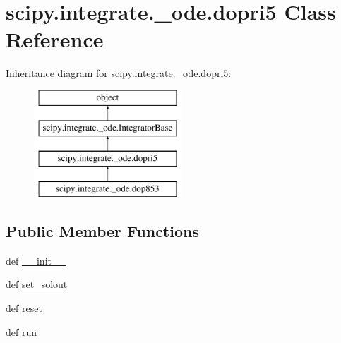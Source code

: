\hypertarget{classscipy_1_1integrate_1_1__ode_1_1dopri5}{}\section{scipy.\+integrate.\+\_\+ode.\+dopri5 Class Reference}
\label{classscipy_1_1integrate_1_1__ode_1_1dopri5}
Inheritance diagram for scipy.\+integrate.\+\_\+ode.\+dopri5\+:\begin{figure}[H]
\begin{center}
\leavevmode
\includegraphics[height=4.000000cm]{classscipy_1_1integrate_1_1__ode_1_1dopri5}
\end{center}
\end{figure}
\subsection*{Public Member Functions}
\begin{DoxyCompactItemize}
\item 
def \hyperlink{classscipy_1_1integrate_1_1__ode_1_1dopri5_af9fad7af3ddfa232b45800622ca1d002}{\+\_\+\+\_\+init\+\_\+\+\_\+}
\item 
def \hyperlink{classscipy_1_1integrate_1_1__ode_1_1dopri5_a724d93909f799af75beb169f0a0a0eb0}{set\+\_\+solout}
\item 
def \hyperlink{classscipy_1_1integrate_1_1__ode_1_1dopri5_ae9b0f5ed253050460b0265286d133fd9}{reset}
\item 
def \hyperlink{classscipy_1_1integrate_1_1__ode_1_1dopri5_a81f41077ed269651906d6b8338336904}{run}
\end{DoxyCompactItemize}
